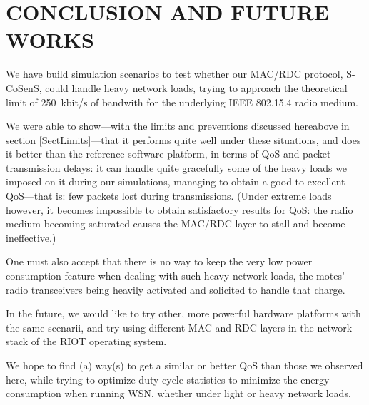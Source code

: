 \documentclass[a4paper,twoside]{article}
\begin{document}

\section{\uppercase{Conclusion and Future Works}}

We have build simulation scenarios to test whether our MAC/RDC protocol,
S-CoSenS, could handle heavy network loads, trying to approach the
theoretical limit of 250~kbit/s of bandwith for the underlying
IEEE 802.15.4 radio medium.

We were able to show---with the limits and preventions discussed hereabove
in section \ref{SectLimits}---that it performs quite well under these
situations, and does it better than the reference software platform, in terms
of QoS and packet transmission delays: it can handle quite gracefully some of
the heavy loads we imposed on it during our simulations, managing to obtain
a good to excellent QoS---that is: few packets lost during transmissions.
(Under extreme loads however, it becomes impossible to obtain satisfactory
results for QoS: the radio medium becoming saturated causes the MAC/RDC
layer to stall and become ineffective.)

One must also accept that there is no way to keep the very low power
consumption feature when dealing with such heavy network loads, the
motes' radio transceivers being heavily activated and solicited to
handle that charge.

\bigskip

In the future, we would like to try other, more powerful hardware platforms
with the same scenarii, and try using different MAC and RDC layers in
the network stack of the RIOT operating system.

We hope to find (a) way(s) to get a similar or better QoS than those
we observed here, while trying to optimize duty cycle statistics
to minimize the energy consumption when running WSN, whether under
light or heavy network loads.




\vfill

{\small
}
\end{document}
